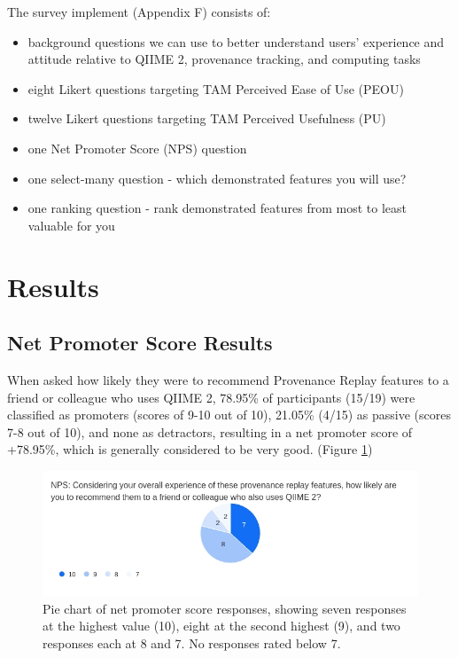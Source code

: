 The survey implement (Appendix F) consists of:
\begin{itemize}
    \item background questions we can use to better understand users’ experience and attitude relative to QIIME 2, provenance tracking, and computing tasks
    \item eight Likert questions targeting TAM Perceived Ease of Use (PEOU)
    \item twelve Likert questions targeting TAM Perceived Usefulness (PU)
    \item one Net Promoter Score (NPS) question
    \item one select-many question - which demonstrated features you will use?
    \item one ranking question - rank demonstrated features from most to least valuable for you
\end{itemize}

\section{Results}

\subsection{Net Promoter Score Results}

When asked how likely they were to recommend Provenance Replay features to a
friend or colleague who uses QIIME 2, 78.95\% of participants (15/19) were
classified as promoters (scores of 9-10 out of 10), 21.05\% (4/15) as passive
(scores 7-8 out of 10), and none as detractors, resulting in a net promoter
score of +78.95\%, which is generally considered to be very good. (Figure \ref{fig:NPS})

\begin{figure}[htbp]
\centering
\includegraphics[width=\textwidth]{figures/NPS.jpg}
\caption[Pie chart of net promoter score responses]%
{Pie chart of net promoter score responses, showing seven responses at the
highest value (10), eight at the second highest (9), and two responses each at 8
and 7. No responses rated below 7.}
\label{fig:NPS}
\end{figure}

